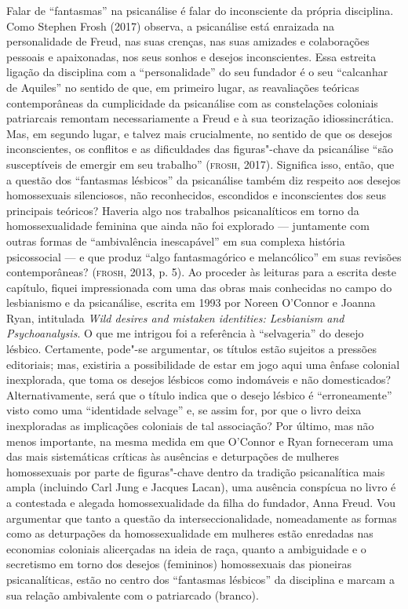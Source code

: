 Falar de ``fantasmas'' na psicanálise é falar do inconsciente da própria
disciplina. Como Stephen Frosh (2017) observa, a psicanálise está enraizada na
personalidade de Freud, nas suas crenças, nas suas amizades e
colaborações pessoais e apaixonadas, nos seus sonhos e desejos
inconscientes. Essa estreita ligação da disciplina com a
``personalidade'' do seu fundador é o seu ``calcanhar de Aquiles'' no
sentido de que, em primeiro lugar, as reavaliações teóricas
contemporâneas da cumplicidade da psicanálise com as constelações
coloniais patriarcais remontam necessariamente a Freud e à sua
teorização idiossincrática. Mas, em segundo lugar, e talvez mais
crucialmente, no sentido de que os desejos inconscientes, os conflitos e
as dificuldades das figuras"-chave da psicanálise ``são susceptíveis de
emergir em seu trabalho'' (\textsc{frosh}, 2017). Significa isso, então, que a
questão dos ``fantasmas lésbicos'' da psicanálise também diz respeito aos
desejos homossexuais silenciosos, não reconhecidos, escondidos e
inconscientes dos seus principais teóricos? Haveria algo nos trabalhos
psicanalíticos em torno da homossexualidade feminina que ainda não foi
explorado --- juntamente com outras formas de ``ambivalência inescapável''
em sua complexa história psicossocial --- e que produz ``algo
fantasmagórico e melancólico'' em suas revisões contemporâneas? (\textsc{frosh},
2013, p. 5). Ao proceder às leituras para a escrita deste capítulo, fiquei
impressionada com uma das obras mais conhecidas no campo do lesbianismo
e da psicanálise, escrita em 1993 por Noreen O'Connor e Joanna Ryan,
intitulada \emph{Wild desires and mistaken identities: Lesbianism and
Psychoanalysis}. O que me intrigou foi a referência à ``selvageria'' do
desejo lésbico. Certamente, pode"-se argumentar, os títulos estão
sujeitos a pressões editoriais; mas, existiria a possibilidade de estar
em jogo aqui uma ênfase colonial inexplorada, que toma os desejos
lésbicos como indomáveis e não domesticados? Alternativamente, será que
o título indica que o desejo lésbico é ``erroneamente'' visto como uma
``identidade selvage'' e, se assim for, por que o livro deixa
inexploradas as implicações coloniais de tal associação? Por último, mas
não menos importante, na mesma medida em que O'Connor e Ryan forneceram
uma das mais sistemáticas críticas às ausências e deturpações de
mulheres homossexuais por parte de figuras"-chave dentro da tradição
psicanalítica mais ampla (incluindo Carl Jung e Jacques Lacan), uma
ausência conspícua no livro é a contestada e alegada homossexualidade da
filha do fundador, Anna Freud. Vou argumentar que tanto a questão da
interseccionalidade, nomeadamente as formas como as deturpações da
homossexualidade em mulheres estão enredadas nas economias coloniais
alicerçadas na ideia de raça, quanto a ambiguidade e o secretismo em
torno dos desejos (femininos) homossexuais das pioneiras psicanalíticas,
estão no centro dos ``fantasmas lésbicos'' da disciplina e marcam a sua
relação ambivalente com o patriarcado (branco).


